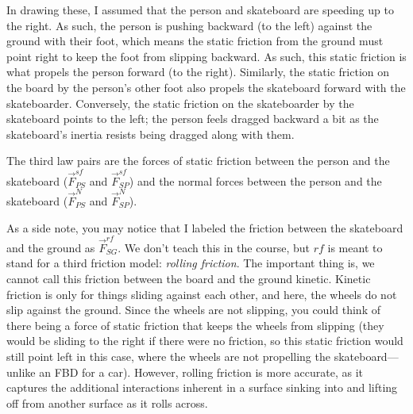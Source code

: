 {In drawing these, I assumed that the person and skateboard are speeding up to the right. As such, the person is pushing backward (to the left) against the ground with their foot, which means the static friction from the ground must point right to keep the foot from slipping backward. As such, this static friction is what propels the person forward (to the right). Similarly, the static friction on the board by the person's other foot also propels the skateboard forward with the skateboarder. Conversely, the static friction on the skateboarder by the skateboard points to the left; the person feels dragged backward a bit as the skateboard's inertia resists being dragged along with them.

The third law pairs are the forces of static friction between the person and the skateboard ($\vec{F}^{sf}_{PS}$ and $\vec{F}^{sf}_{SP}$) and the normal forces between the person and the skateboard ($\vec{F}^{N}_{PS}$ and $\vec{F}^{N}_{SP}$).

As a side note, you may notice that I labeled the friction between the skateboard and the ground as $\vec{F}^{rf}_{SG}$. We don't teach this in the course, but $rf$ is meant to stand for a third friction model: \textit{rolling friction}. The important thing is, we cannot call this friction between the board and the ground kinetic. Kinetic friction is only for things sliding against each other, and here, the wheels do not slip against the ground. Since the wheels are not slipping, you could think of there being a force of static friction that keeps the wheels from slipping (they would be sliding to the right if there were no friction, so this static friction would still point left in this case, where the wheels are not propelling the skateboard---unlike an FBD for a car). However, rolling friction is more accurate, as it captures the additional interactions inherent in a surface sinking into and lifting off from another surface as it rolls across.
}